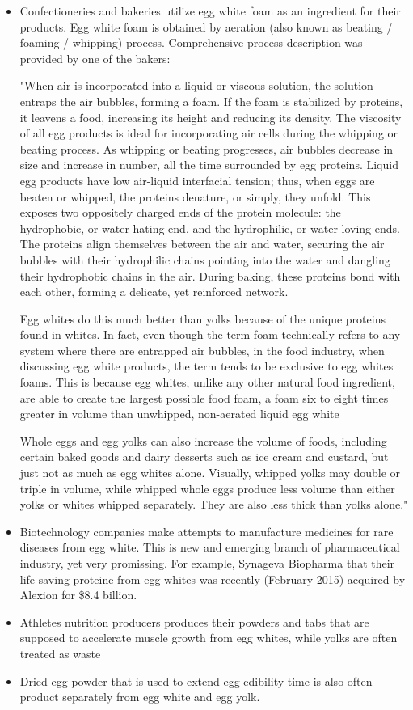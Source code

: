 \documentclass[12pt,twoside,a4paper]{article}
\begin{document}
\begin{itemize}
\item Confectioneries and bakeries utilize egg white foam as an ingredient for their products.
Egg white foam is obtained by aeration (also known as beating / foaming / whipping) process.
Comprehensive process description was provided by one of the bakers:

"When air is incorporated into a liquid or viscous solution, the solution entraps the air bubbles, forming a foam. If the foam is stabilized by proteins, it leavens a food, increasing its height and reducing its density. The viscosity of all egg products is ideal for incorporating air cells during the whipping or beating process. As whipping or beating progresses, air bubbles decrease in size and increase in number, all the time surrounded by egg proteins. Liquid egg products have low air-liquid interfacial tension; thus, when eggs are beaten or whipped, the proteins denature, or simply, they unfold. This exposes two oppositely charged ends of the protein molecule: the hydrophobic, or water-hating end, and the hydrophilic, or water-loving ends. The proteins align themselves between the air and water, securing the air bubbles with their hydrophilic chains pointing into the water and dangling their hydrophobic chains in the air. During baking, these proteins bond with each other, forming a delicate, yet reinforced network.

Egg whites do this much better than yolks because of the unique proteins found in whites. In fact, even though the term foam technically refers to any system where there are entrapped air bubbles, in the food industry, when discussing egg white products, the term tends to be exclusive to egg whites foams. This is because egg whites, unlike any other natural food ingredient, are able to create the largest possible food foam, a foam six to eight times greater in volume than unwhipped, non-aerated liquid egg white

Whole eggs and egg yolks can also increase the volume of foods, including certain baked goods and dairy desserts such as ice cream and custard, but just not as much as egg whites alone. Visually, whipped yolks may double or triple in volume, while whipped whole eggs produce less volume than either yolks or whites whipped separately. They are also less thick than yolks alone." \cite{eggprop}
\item Biotechnology companies make attempts to manufacture medicines for rare diseases from egg white. This is new and emerging branch of pharmaceutical industry, yet very promissing. For example, Synageva Biopharma that their life-saving proteine from egg whites was recently (February 2015) acquired by Alexion for \$8.4 billion.
\item Athletes nutrition producers produces their powders and tabs that are supposed to accelerate muscle growth from egg whites, while yolks are often treated as waste
\item Dried egg powder that is used to extend egg edibility time is also often product separately from egg white and egg yolk.

\end{itemize}
\end{document}
